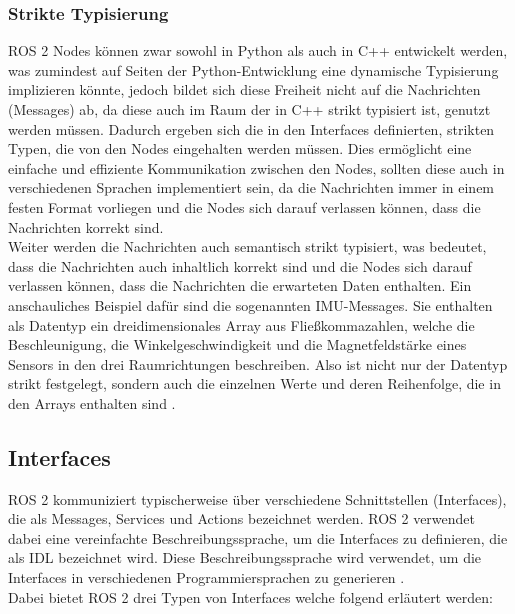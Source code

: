 \subsubsection{Strikte Typisierung}\label{subsubsec:ROS2StrikteTypisierung}
\ac{ROS} 2 Nodes können zwar sowohl in Python als auch in C++ entwickelt werden, was zumindest auf Seiten der Python-Entwicklung eine dynamische Typisierung implizieren könnte, jedoch bildet sich diese Freiheit nicht auf die Nachrichten (Messages) ab, da diese auch im Raum der in C++ strikt typisiert ist, genutzt werden müssen. Dadurch ergeben sich die in den Interfaces definierten, strikten Typen, die von den Nodes eingehalten werden müssen. Dies ermöglicht eine einfache und effiziente Kommunikation zwischen den Nodes, sollten diese auch in verschiedenen Sprachen implementiert sein, da die Nachrichten immer in einem festen Format vorliegen und die Nodes sich darauf verlassen können, dass die Nachrichten korrekt sind.
\\

\noindent
Weiter werden die Nachrichten auch semantisch strikt typisiert, was bedeutet, dass die Nachrichten auch inhaltlich korrekt sind und die Nodes sich darauf verlassen können, dass die Nachrichten die erwarteten Daten enthalten. Ein anschauliches Beispiel dafür sind die sogenannten \ac{IMU}-Messages. Sie enthalten als Datentyp ein dreidimensionales Array aus Fließkommazahlen, welche die Beschleunigung, die Winkelgeschwindigkeit und die Magnetfeldstärke eines Sensors in den drei Raumrichtungen beschreiben. Also ist nicht nur der Datentyp strikt festgelegt, sondern auch die einzelnen Werte und deren Reihenfolge, die in den Arrays enthalten sind \cite{ROSTopics}.\\

\subsection{Interfaces}\label{subsec:ROS2Interfaces}
\ac{ROS} 2 kommuniziert typischerweise über verschiedene Schnittstellen (Interfaces), die als Messages, Services und Actions bezeichnet werden. \ac{ROS} 2 verwendet dabei eine vereinfachte Beschreibungssprache, um die Interfaces zu definieren, die als \ac{IDL} bezeichnet wird. Diese Beschreibungssprache wird verwendet, um die Interfaces in verschiedenen Programmiersprachen zu generieren \cite{ROSInterfaces}.
\\

\noindent
Dabei bietet \ac{ROS} 2 drei Typen von Interfaces welche folgend erläutert werden:\\

